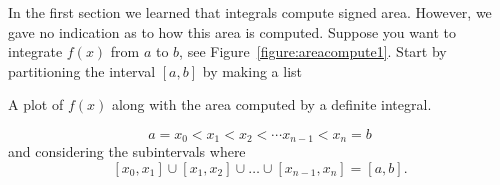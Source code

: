 In the first section we learned that integrals compute signed
area. However, we gave no indication as to how this area is
computed. Suppose you want to integrate $f(x)$ from $a$ to $b$, see
Figure~\ref{figure:areacompute1}. Start by partitioning the interval
$[a,b]$ by making a list

\begin{marginfigure}
\caption{A plot of $f(x)$ along with the area computed by a definite
  integral.}
\label{figure:areacompute1}
\end{marginfigure}

\[
a = x_0 < x_1 <x_2 < \cdots x_{n-1}< x_n = b
\]
and considering the subintervals where
\[
[x_0,x_1]\cup [x_1, x_2]\cup \dots \cup [x_{n-1},x_n] = [a,b].
\]

